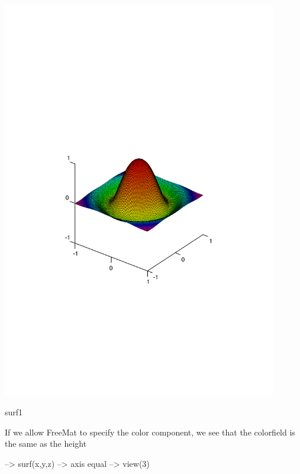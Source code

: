  
\begin{DoxyImage}
\includegraphics[width=12cm]{surf1}
\caption{surf1}
\end{DoxyImage}
 If we allow Free\-Mat to specify the color component, we see that the colorfield is the same as the height


\begin{DoxyVerbInclude}
--> surf(x,y,z)
--> axis equal
--> view(3)
\end{DoxyVerbInclude}


